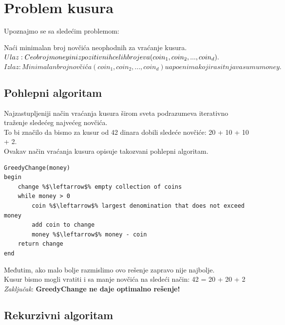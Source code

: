 \section{Problem kusura}

\noindent Upoznajmo se sa sledećim problemom:\\

\begin{problem}
	Naći minimalan broj novčića neophodnih za vraćanje kusura. \\
	$Ulaz: Ceo broj money i niz pozitivnih celih brojeva (coin_1, coin_2, ..., coin_d). \\$
	$Izlaz: Minimalan broj novčića (coin_1, coin_2, ..., coin_d) u apoenima koji rasitnjava sumu money.$
\end{problem}

\subsection{Pohlepni algoritam}

Najzastupljeniji način vraćanja kusura širom sveta podrazumeva iterativno traženje sledećeg najvećeg novčića.\\
To bi značilo da bismo za kusur od 42 dinara dobili sledeće novčiće: 20 + 10 + 10 + 2. \\
Ovakav način vraćanja kusura opisuje takozvani pohlepni algoritam. \\

\begin{lstlisting}
GreedyChange(money)
begin
    change %$\leftarrow$% empty collection of coins
	while money > 0
		coin %$\leftarrow$% largest denomination that does not exceed money
		add coin to change
		money %$\leftarrow$% money - coin
	return change
end
\end{lstlisting}

Međutim, ako malo bolje razmislimo ovo rešenje zapravo nije najbolje.\\
Kusur bismo mogli vratiti i sa manje novčića na sledeći način: 42 = 20 + 20 + 2 \\

\textit{Zaključak}: \textbf{GreedyChange ne daje optimalno rešenje!}

\subsection{Rekurzivni algoritam}

